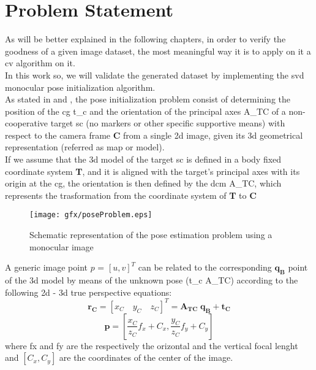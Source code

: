 \section{Problem Statement}
As will be better explained in the following chapters, in order to verify the goodness of a given image dataset, the most meaningful way it is to apply on it a \acrshort{cv} algorithm on it.\\
In this work so, we will validate the generated dataset by implementing the \acrfull{svd} monocular pose initialization algorithm.\\
As stated in \cite{D2014} and \cite{Sharma2018}, the pose initialization problem consist of determining the position of the \acrfull{cg} \gls{t_c} and the orientation of the principal axes \gls{A_TC} of a non-cooperative target \acrshort{sc} (no markers or other specific supportive means) with respect to the camera frame \textbf{C} from a single \acrfull{2d} image, given its \acrfull{3d} geometrical representation (referred as map or model).\\
If we assume that the \acrshort{3d} model of the target \acrshort{sc} is defined in a body fixed coordinate system \textbf{T}, and it is aligned with the target's principal axes with its origin at the \acrshort{cg}, the orientation is then defined by the \acrfull{dcm} \gls{A_TC}, which represents the trasformation from the coordinate system of \textbf{T} to \textbf{C}
\begin{figure}[H]
 	\centering
 	\texttt{[image: gfx/poseProblem.eps]}
    \caption{Schematic representation of the pose estimation problem using a monocular image \cite{Sharma2018}}
    \label{fig:gyro}
\end{figure}
A generic image point $p$ = $ [u,v]^T $ can be related to the corresponding $\mathbf{q_B}$ point of the \acrshort{3d} model by means of the unknown pose (\gls{t_c} \gls{A_TC}) according to the following \acrshort{2d} - \acrshort{3d} true perspective equations: 
\begin{equation}
 \mathbf{r_C} = \left[x_C \quad  y_C \quad z_C\right]^T = \mathbf{A_{TC}} \; \mathbf{q_B} + \mathbf{t_C}
\end{equation}
\begin{equation}
 \mathbf{p} = \left[ \frac{x_C}{z_C} f_x + C_x , \frac{y_C}{z_C} f_y + C_y \right]
\end{equation}
where \gls{fx} and \gls{fy} are the respectively the orizontal and the vertical focal lenght and $[C_x, C_y]$ are the coordinates of the center of the image.\\
